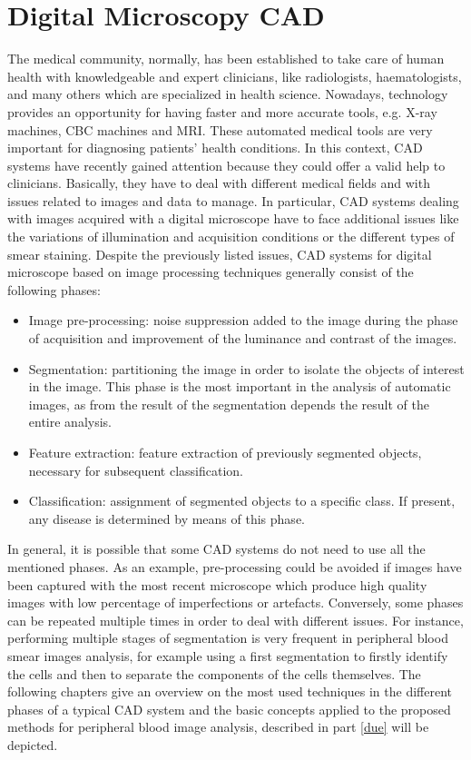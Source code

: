 \documentclass[final,a4paper,12pt,english]{UnicaPhdThesis3}
\begin{document}
\part{Digital Microscopy CAD} \label{uno}
The medical community, normally, has been established to take care of human health with knowledgeable and expert clinicians, like radiologists, haematologists, and many others which are specialized in health science. Nowadays, technology provides an opportunity for having faster and more accurate tools, e.g. X-ray machines, CBC machines and MRI. These automated medical tools are very important for diagnosing patients' health conditions. In this context, CAD systems have recently gained attention because they could offer a valid help to clinicians. Basically, they have to deal with different medical fields and with issues related to images and data to manage. In particular, CAD systems dealing with images acquired with a digital microscope have to face additional issues like the variations of illumination and acquisition conditions or the different types of smear staining. Despite the previously listed issues, CAD systems for digital microscope based on image processing techniques generally consist of the following phases:
\begin{itemize}
\item Image pre-processing: noise suppression added to the image during the phase of acquisition and improvement of the luminance and contrast of the images.
\item Segmentation: partitioning the image in order to isolate the objects of interest in the image. This phase is the most important in the analysis of automatic images, as from the result of the segmentation depends the result of the entire analysis.
\item Feature extraction: feature extraction of previously segmented objects, necessary for subsequent classification.
\item Classification: assignment of segmented objects to a specific class. If present, any disease is determined by means of this phase. 
\end{itemize}

In general, it is possible that some CAD systems do not need to use all the mentioned phases. As an example, pre-processing could be avoided if images have been captured with the most recent microscope which produce high quality images with low percentage of imperfections or artefacts. Conversely, some phases can be repeated multiple times in order to deal with different issues. For instance, performing multiple stages of segmentation is very frequent in peripheral blood smear images analysis, for example using a first segmentation to firstly identify the cells and then to separate the components of the cells themselves. 
The following chapters give an overview on the most used techniques in the different phases of a typical CAD system and the basic concepts applied to the proposed methods for peripheral blood image analysis, described in part \ref{due} will be depicted.
\end{document}
